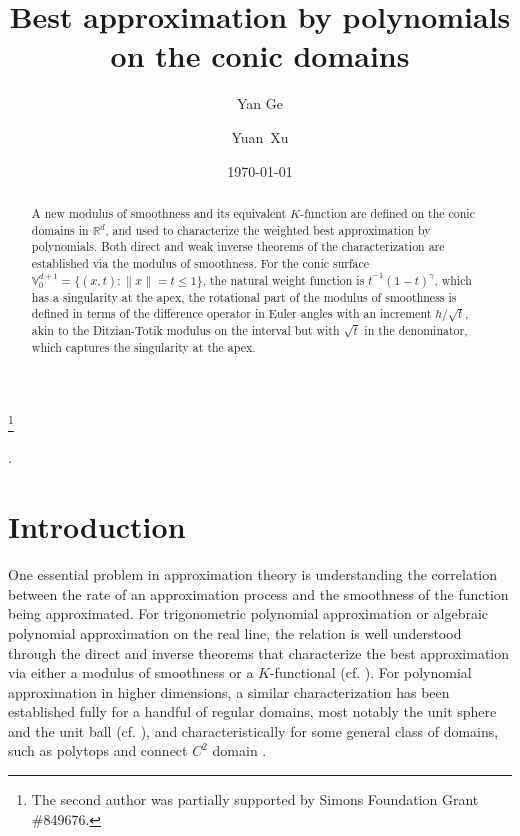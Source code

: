 \documentclass{amsart}
\theoremstyle{remark}
\def\g{{\gamma}}
\def\RR{{\mathbb R}}
\def\VV{{\mathbb V}}
\def\g{{\gamma}}
\def\RR{{\mathbb R}}
\def\VV{{\mathbb V}}
\begin{document}
\title{Best approximation by polynomials on the conic domains} 
\author{Yan Ge}
\address{Department of Mathematics, University of Oregon, Eugene, 
OR 97403--1222, USA}
\author{Yuan~Xu}
\address{Department of Mathematics, University of Oregon, Eugene, 
OR 97403--1222, USA}
\thanks{The second author was partially supported by Simons Foundation Grant \#849676.}
\date{\today}  
.

\begin{abstract}  
A new modulus of smoothness and its equivalent $K$-function are defined on the conic domains in $\RR^d$,
and used to characterize the weighted best approximation by polynomials. Both direct and weak inverse 
theorems of the characterization are established via the modulus of smoothness. 
For the conic surface $\VV_0^{d+1} = \{(x,t): \|x\| = t\le 1\}$, the natural weight function is $t^{-1}(1-t)^\g$, 
which has a singularity at the apex, the rotational part of the modulus of smoothness is defined in terms of 
the difference operator in Euler angles with an increment $h/\sqrt{t}$, akin to the Ditzian-Totik modulus on 
the interval but with $\sqrt{t}$ in the denominator, which captures the singularity at the apex. 
\end{abstract}
\maketitle

\section{Introduction}
\setcounter{equation}{0}

One essential problem in approximation theory is understanding the correlation between the rate of an approximation process 
and the smoothness of the function being approximated. For trigonometric polynomial approximation or algebraic polynomial 
approximation on the real line, the relation is well understood through the direct and inverse theorems that characterize 
the best approximation via either a modulus of smoothness or a $K$-functional (cf. \cite{DL, DT}). For polynomial approximation 
in higher dimensions, a similar characterization has been established fully for a handful of regular domains, most notably 
the unit sphere and the unit ball (cf. \cite{DaiX2, DaiX, LN, Rus}), and characteristically for some general class of domains, 
such as polytops \cite{T1, T2} and connect $C^2$ domain \cite{DP}. 
\end{document}
